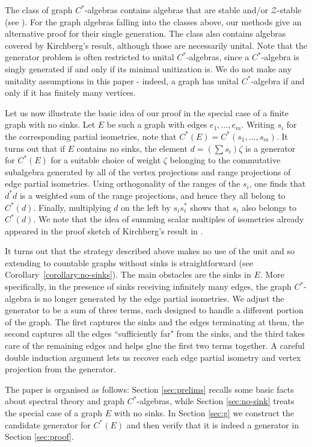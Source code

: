\documentclass[12pt, a4paper]
{amsart}
\theoremstyle{definition}
\theoremstyle{remark}
\numberwithin{equation}{section}
\newcommand{\Cstar}{\ensuremath{C^*}}
\newcommand{\cZ}{\ensuremath{\mathcal{Z}}}
\begin{document}
The class of graph \Cstar-algebras contains algebras that are stable and/or \cZ-stable (see \cite{Tomforde04,Faurot25}). For the graph algebras falling into the classes above, our methods give an alternative proof for their single generation. The class also contains algebras covered by Kirchberg's result, although those are necessarily unital. Note that the generator problem is often restricted to unital \Cstar-algebras, since a \Cstar-algebra is singly generated if and only if its minimal unitization is. We do not make any unitality assumptions in this paper - indeed, a graph has unital \Cstar-algebra if and only if it has finitely many vertices.

Let us now illustrate the basic idea of our proof in the special case of a finite graph with no sinks. Let $E$ be such a graph with edges $e_1,\dots,e_m$. Writing $s_i$ for the corresponding partial isometries, note that $\Cstar(E) = \Cstar(s_1,\dots,s_m)$. It turns out that if $E$ contains no sinks, the element $d= \left( \sum s_i \right)\zeta$ is a generator for $\Cstar(E)$ for a suitable choice of weight $\zeta$ belonging to the commutative subalgebra generated by all of the vertex projections and range projections of edge partial isometries. Using orthogonality of the ranges of the $s_i$, one finds that $d^*d$ is a weighted sum of the range projections, and hence they all belong to $\Cstar(d)$. Finally, multiplying $d$ on the left by $s_is_i^*$ shows that $s_i$ also belongs to $\Cstar(d)$. We note that the idea of summing scalar multiples of isometries already appeared in the proof sketch of Kirchberg's result in \cite[Theorem~2.4]{TW14}. 

It turns out that the strategy described above makes no use of the unit and so extending to countable graphs without sinks is straightforward (see Corollary~\ref{corollary:no-sinks}). The main obstacles are the sinks in $E$. More specifically, in the presence of sinks receiving infinitely many edges, the graph \Cstar-algebra is no longer generated by the edge partial isometries. We adjust the generator to be a sum of three terms, each designed to handle a different portion of the graph. The first captures the sinks and the edges terminating at them, the second captures all the edges ``sufficiently far" from the sinks, and the third takes care of the remaining edges and helps glue the first two terms together. A careful double induction argument lets us recover each edge partial isometry and vertex projection from the generator.

The paper is organised as follows: Section \ref{sec:prelims} recalls some basic facts about spectral theory and graph \Cstar-algebras, while Section \ref{sec:no-sink} treats the special case of a graph $E$ with no sinks. In Section \ref{sec:g} we construct the candidate generator for $\Cstar(E)$ and then verify that it is indeed a generator in Section \ref{sec:proof}.
\end{document}

